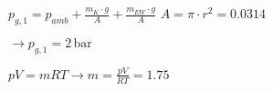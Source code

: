 \( p_{g,1} = p_{amb} + \frac{m_{K} \cdot g}{A} + \frac{m_{EW} \cdot g}{A} \)  
\( A = \pi \cdot r^2 = 0.0314 \)  

\( \rightarrow p_{g,1} = 2 \, \text{bar} \)  

\( pV = mRT \rightarrow m = \frac{pV}{RT} = 1.75 \)